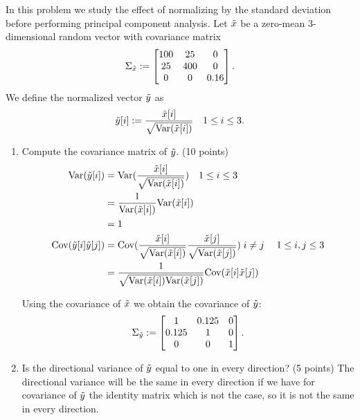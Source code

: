 \documentclass[11pt,twoside]{article}
\begin{document}
\begin{exam}
\begin{exercise}
\end{exercise}

\newpage

\item
\begin{exercise}
\begin{problem}
In this problem we study the effect of normalizing by the standard deviation before performing principal component analysis. Let $\tilde{  x }$ be a zero-mean $3$-dimensional random vector with covariance matrix 
\begin{align}
\Sigma_{\tilde{  x }} := \begin{bmatrix}  100 & 25 & 0 \\ 25 & 400 & 0 \\ 0 & 0 & 0.16  \end{bmatrix}.
\end{align}
We define the normalized vector $\tilde{  y }$ as
\begin{align}
\ry[i] := \frac{ \rx[i]}{ \sqrt{\var (\rx[i])}} \quad 1 \leq i \leq 3.
\end{align}
\begin{enumerate}
\item Compute the covariance matrix of $\tilde{  y }$.  (10 points)
\begin{align*}
	\var(\ry[i] )	&=	\var(\frac{ \rx[i]}{ \sqrt{\var (\rx[i])}})  \quad 1 \leq i \leq 3\\
			&= \frac{1}{\var (\rx[i]) } \var (\rx[i]) \\
			&= 1 \\
	\Cov({\ry[i] }{\ry[j]})	&= \Cov({\frac{ \rx[i]}{ \sqrt{\var (\rx[i])}}} {\frac{ \rx[j]}{ \sqrt{\var (\rx[j])}}}) \; i \neq j  \; \quad 1 \leq i,j \leq 3\\
					&= \frac{1} { \sqrt{\var (\rx[i]) \var (\rx[j])  }} \Cov( {\rx[i]} {\rx[j]}) \\
\end{align*}

Using the covariance of $\tilde{  x }$ we obtain the covariance of $\tilde{  y }$:
\begin{align}
\Sigma_{\tilde{  y }} := \begin{bmatrix}  1 & 0.125 & 0 \\ 0.125 & 1 & 0 \\ 0 & 0 & 1  \end{bmatrix}.
\end{align}

\item Is the directional variance of $\tilde{  y }$ equal to one in every direction?  (5 points)
The directional variance will be the same in every direction if we have for covariance of $\tilde{  y }$ the identity matrix which is not the case, so it is not the same in every direction.


\end{enumerate}
\end{problem}
\end{exercise}
\end{exam}
\end{document}
